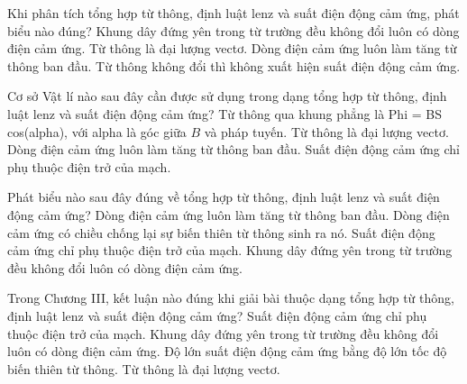 \begin{ex}
Khi phân tích tổng hợp từ thông, định luật lenz và suất điện động cảm ứng, phát biểu nào đúng?
\choice
{Khung dây đứng yên trong từ trường đều không đổi luôn có dòng điện cảm ứng.}
{Từ thông là đại lượng vectơ.}
{Dòng điện cảm ứng luôn làm tăng từ thông ban đầu.}
{\True Từ thông không đổi thì không xuất hiện suất điện động cảm ứng.}
\end{ex}

\begin{ex}
Cơ sở Vật lí nào sau đây cần được sử dụng trong dạng tổng hợp từ thông, định luật lenz và suất điện động cảm ứng?
\choice
{\True Từ thông qua khung phẳng là Phi = BS cos(alpha), với alpha là góc giữa $B$ và pháp tuyến.}
{Từ thông là đại lượng vectơ.}
{Dòng điện cảm ứng luôn làm tăng từ thông ban đầu.}
{Suất điện động cảm ứng chỉ phụ thuộc điện trở của mạch.}
\end{ex}

\begin{ex}
Phát biểu nào sau đây đúng về tổng hợp từ thông, định luật lenz và suất điện động cảm ứng?
\choice
{Dòng điện cảm ứng luôn làm tăng từ thông ban đầu.}
{\True Dòng điện cảm ứng có chiều chống lại sự biến thiên từ thông sinh ra nó.}
{Suất điện động cảm ứng chỉ phụ thuộc điện trở của mạch.}
{Khung dây đứng yên trong từ trường đều không đổi luôn có dòng điện cảm ứng.}
\end{ex}

\begin{ex}
Trong Chương III, kết luận nào đúng khi giải bài thuộc dạng tổng hợp từ thông, định luật lenz và suất điện động cảm ứng?
\choice
{Suất điện động cảm ứng chỉ phụ thuộc điện trở của mạch.}
{Khung dây đứng yên trong từ trường đều không đổi luôn có dòng điện cảm ứng.}
{\True Độ lớn suất điện động cảm ứng bằng độ lớn tốc độ biến thiên từ thông.}
{Từ thông là đại lượng vectơ.}
\end{ex}

